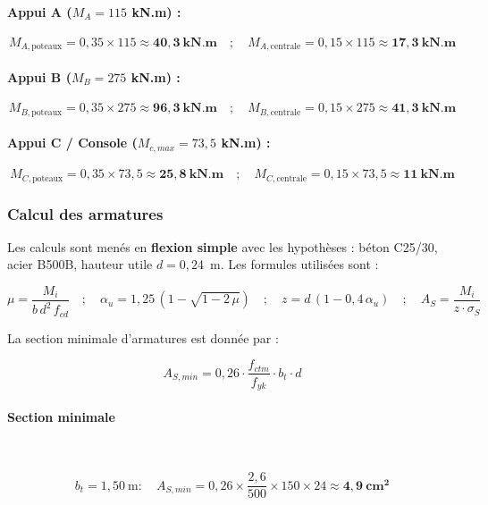 \paragraph{Appui A ($M_A = 115$ kN.m) :}

\[
M_{A,\text{poteaux}} = 0{,}35 \times 115 \approx \mathbf{40{,}3~\text{kN.m}}
\quad ; \quad
M_{A,\text{centrale}} = 0{,}15 \times 115 \approx \mathbf{17{,}3~\text{kN.m}}
\]

\paragraph{Appui B ($M_B = 275$ kN.m) :}

\[
M_{B,\text{poteaux}} = 0{,}35 \times 275 \approx \mathbf{96{,}3~\text{kN.m}}
\quad ; \quad
M_{B,\text{centrale}} = 0{,}15 \times 275 \approx \mathbf{41{,}3~\text{kN.m}}
\]

\paragraph{Appui C / Console ($M_{c,max} = 73{,}5$ kN.m) :}

\[
M_{C,\text{poteaux}} = 0{,}35 \times 73{,}5 \approx \mathbf{25{,}8~\text{kN.m}}
\quad ; \quad
M_{C,\text{centrale}} = 0{,}15 \times 73{,}5 \approx \mathbf{11~\text{kN.m}}
\]

\subsubsection{Calcul des armatures}

Les calculs sont menés en \textbf{flexion simple} avec les hypothèses : béton C25/30, acier B500B, hauteur utile $d = 0{,}24$~m. Les formules utilisées sont :

\[
\mu = \frac{M_i}{b \, d^2 \, f_{cd}}
\quad ; \quad
\alpha_u = 1{,}25 \, (1 - \sqrt{1 - 2\,\mu})
\quad ; \quad
z = d \, (1 - 0{,}4 \, \alpha_u)
\quad ; \quad
A_S = \frac{M_i}{z \cdot \sigma_S}
\]

La section minimale d'armatures est donnée par :

\[
A_{S,min} = 0{,}26 \cdot \frac{f_{ctm}}{f_{yk}} \cdot b_t \cdot d
\]

\paragraph{Section minimale}~

\[
b_t = 1{,}50~\text{m} : \quad A_{S,min} = 0{,}26 \times \frac{2{,}6}{500} \times 150 \times 24 \approx \mathbf{4{,}9~\text{cm}^2}
\]

